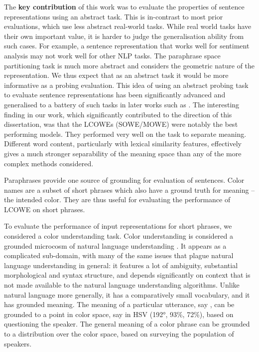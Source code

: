 \documentclass{book}
\begin{document}
The \textbf{key contribution} of this work was to evaluate the properties of sentence representations using an abstract task.
This is in-contrast to most prior evaluations, which use less abstract real-world tasks.
While real world tasks have their own important value, it is harder to judge the generalisation ability from such cases.
For example, a sentence representation that works well for sentiment analysis may not work well for other NLP tasks.
The paraphrase space partitioning task is much more abstract and considers the geometric nature of the representation.
We thus expect that as an abstract task it would be more informative as a probing evaluation.
This idea of using an abstract probing task to evaluate sentence representations has been significantly advanced and generalised to a battery of such tasks in later works such as \citet{adi2017Probing,ac2018probingsentencevectors}.
The interesting finding in our work, which significantly contributed to the direction of this dissertation,
was that the LCOWEs (SOWE/MOWE) were notably the best performing models.
They performed very well on the task to separate meaning.
Different word content, particularly with lexical similarity features, effectively gives a much stronger separability of the meaning space than any of the more complex methods considered.

Paraphrases provide one source of grounding for evaluation of sentences.
Color names are a subset of short phrases which also have a ground truth for meaning -- the intended color.
They are thus useful for evaluating the performance of LCOWE on short phrases.

To evaluate the performance of input representations for short phrases, we considered a color understanding task.
Color understanding is considered a grounded microcosm of natural language understanding \citep{2016arXiv160603821M}.
It appears as a complicated sub-domain, with many of the same issues that plague natural language understanding in general:
it features a lot of ambiguity, substantial morphological and syntax structure, and depends significantly on context that is not made available to the natural language understanding algorithms.
Unlike natural language more generally, it has a comparatively small vocabulary, and it has grounded meaning.
The meaning of a particular utterance, say , can be grounded to a point in color space, say in HSV (192°, 93\%, 72\%), based on questioning the speaker.
The general meaning of a color phrase can be grounded to a distribution over the color space, based on surveying the population of speakers.
\end{document}
